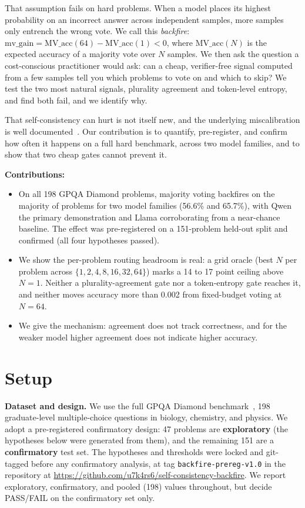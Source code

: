 \documentclass{article}
\begin{document}
That assumption fails on hard problems. When a model places its highest
probability on an incorrect answer across independent samples, more samples
only entrench the wrong vote. We call this \emph{backfire}:
$\text{mv\_gain} = \text{MV\_acc}(64) - \text{MV\_acc}(1) < 0$, where
$\text{MV\_acc}(N)$ is the expected accuracy of a majority vote over $N$
samples. We then ask
the question a cost-conscious practitioner would ask: can a cheap,
verifier-free signal computed from a few samples tell you which problems to
vote on and which to skip? We test the two most natural signals, plurality
agreement and token-level entropy, and find both fail, and we identify why.

That self-consistency can hurt is not itself new, and the underlying
miscalibration is well documented~\citep{guo2017calibration,
kadavath2022language}. Our contribution is to quantify, pre-register, and
confirm how often it happens on a full hard benchmark, across two model
families, and to show that two cheap gates cannot prevent it.

\textbf{Contributions:}
\begin{itemize}
  \item On all 198 GPQA Diamond problems, majority voting backfires on the
        majority of problems for two model families (56.6\% and 65.7\%), with
        Qwen the primary demonstration and Llama corroborating from a
        near-chance baseline. The effect was pre-registered on a 151-problem
        held-out split and confirmed (all four hypotheses passed).
  \item We show the per-problem routing headroom is real: a grid oracle (best
        $N$ per problem across $\{1,2,4,8,16,32,64\}$) marks a 14 to 17 point
        ceiling above $N=1$. Neither a plurality-agreement gate nor a
        token-entropy gate reaches it, and neither moves accuracy more than
        0.002 from fixed-budget voting at $N=64$.
  \item We give the mechanism: agreement does not track correctness, and for
        the weaker model higher agreement does not indicate higher accuracy.
\end{itemize}

\section{Setup}

\textbf{Dataset and design.} We use the full GPQA Diamond
benchmark~\citep{rein2023gpqa}, 198 graduate-level multiple-choice questions
in biology, chemistry, and physics. We adopt a pre-registered confirmatory
design: 47 problems are \textbf{exploratory} (the hypotheses below were
generated from them), and the remaining 151 are a \textbf{confirmatory} test
set. The hypotheses and thresholds were locked and git-tagged before any
confirmatory analysis, at tag \texttt{backfire-prereg-v1.0} in the repository
at \url{https://github.com/u7k4rs6/self-consistency-backfire}. We report
exploratory, confirmatory, and pooled (198) values throughout, but decide
PASS/FAIL on the confirmatory set only.
\end{document}
